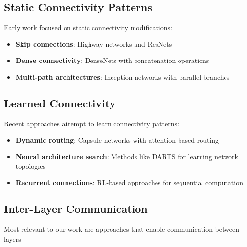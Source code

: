 \documentclass[11pt]{article}
\begin{document}
\subsection{Static Connectivity Patterns}

Early work focused on static connectivity modifications:
\begin{itemize}
    \item \textbf{Skip connections}: Highway networks \cite{srivastava2015highway} and ResNets \cite{he2016deep}
    \item \textbf{Dense connectivity}: DenseNets \cite{huang2017densely} with concatenation operations
    \item \textbf{Multi-path architectures}: Inception networks \cite{szegedy2015going} with parallel branches
\end{itemize}

\subsection{Learned Connectivity}

Recent approaches attempt to learn connectivity patterns:
\begin{itemize}
    \item \textbf{Dynamic routing}: Capsule networks \cite{sabour2017dynamic} with attention-based routing
    \item \textbf{Neural architecture search}: Methods like DARTS \cite{liu2018darts} for learning network topologies
    \item \textbf{Recurrent connections}: RL-based approaches for sequential computation \cite{neil2016phased}
\end{itemize}

\subsection{Inter-Layer Communication}

Most relevant to our work are approaches that enable communication between layers:
\end{document}
